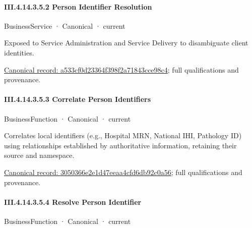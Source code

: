 \paragraph*{III.4.14.3.5.2 Person Identifier Resolution}
\label{navigation:III.4.14.3.5.2}

\label{element:a533cf0d23364f398f2a71843cce98c4}
{\small BusinessService · Canonical · current}\par

Exposed to Service Administration and Service Delivery to disambiguate client identities.


{\footnotesize \href{../../../../../../../../continuum/business/business-service/a533cf0d23364f398f2a71843cce98c4.md}{Canonical record: a533cf0d23364f398f2a71843cce98c4}; full qualifications and provenance.}\par
\paragraph*{III.4.14.3.5.3 Correlate Person Identifiers}
\label{navigation:III.4.14.3.5.3}

\label{element:3050366e2e1d47eeaa4cfd6db92c0a56}
{\small BusinessFunction · Canonical · current}\par

Correlates local identifiers (e.g., Hospital MRN, National IHI, Pathology ID) using relationships established by authoritative information, retaining their source and namespace.


{\footnotesize \href{../../../../../../../../continuum/business/business-function/3050366e2e1d47eeaa4cfd6db92c0a56.md}{Canonical record: 3050366e2e1d47eeaa4cfd6db92c0a56}; full qualifications and provenance.}\par
\paragraph*{III.4.14.3.5.4 Resolve Person Identifier}
\label{navigation:III.4.14.3.5.4}

\label{element:2f128e1d8de642478c18b7a0ccb8e083}
{\small BusinessFunction · Canonical · current}\par

